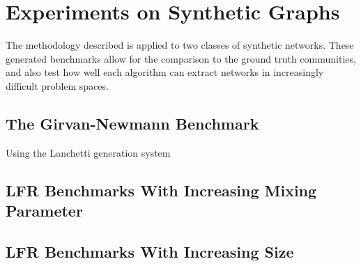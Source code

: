 \chapter{Experiments on Synthetic Graphs}

The methodology described is applied to two classes of synthetic networks. These generated benchmarks allow for the comparison to the ground truth communities, and also test how well each algorithm can extract networks in increasingly difficult problem spaces.

\section{The Girvan-Newmann Benchmark}
Using the Lanchetti generation system


\section{LFR Benchmarks With Increasing Mixing \\ Parameter}


\section{LFR Benchmarks With Increasing Size}